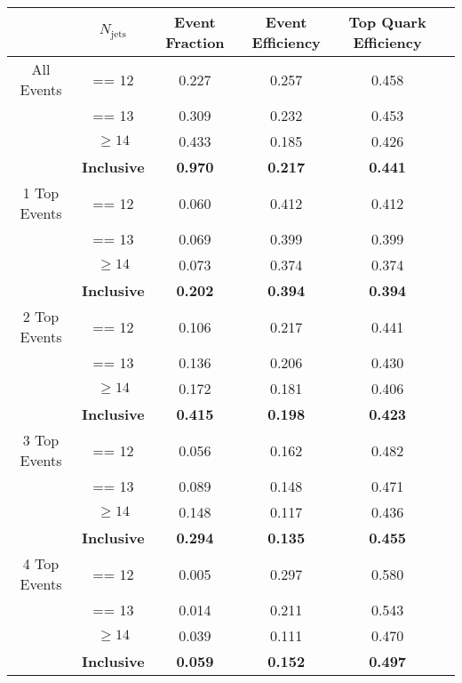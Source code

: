 \begin{tabular}{c | c | c | c c c}
\hline
\hline
& $N_\mathrm{jets}$ & Event Fraction & Event Efficiency &Top Quark Efficiency\\
\hline
All Events&== 12 & 0.227 & 0.257 & 0.458\\
&== 13 & 0.309 & 0.232 & 0.453\\
&$\geq 14$ & 0.433 & 0.185 & 0.426\\
&\textbf{Inclusive} & \textbf{0.970} & \textbf{0.217} & \textbf{0.441}\\
\hline
\hline
1 Top Events&== 12 & 0.060 & 0.412 & 0.412\\
&== 13 & 0.069 & 0.399 & 0.399\\
&$\geq 14$ & 0.073 & 0.374 & 0.374\\
&\textbf{Inclusive} & \textbf{0.202} & \textbf{0.394} & \textbf{0.394}\\
\hline
\hline
2 Top Events&== 12 & 0.106 & 0.217 & 0.441\\
&== 13 & 0.136 & 0.206 & 0.430\\
&$\geq 14$ & 0.172 & 0.181 & 0.406\\
&\textbf{Inclusive} & \textbf{0.415} & \textbf{0.198} & \textbf{0.423}\\
\hline
\hline
3 Top Events&== 12 & 0.056 & 0.162 & 0.482\\
&== 13 & 0.089 & 0.148 & 0.471\\
&$\geq 14$ & 0.148 & 0.117 & 0.436\\
&\textbf{Inclusive} & \textbf{0.294} & \textbf{0.135} & \textbf{0.455}\\
\hline
\hline
4 Top Events&== 12 & 0.005 & 0.297 & 0.580\\
&== 13 & 0.014 & 0.211 & 0.543\\
&$\geq 14$ & 0.039 & 0.111 & 0.470\\
&\textbf{Inclusive} & \textbf{0.059} & \textbf{0.152} & \textbf{0.497}\\
\hline
\hline
\end{tabular}

